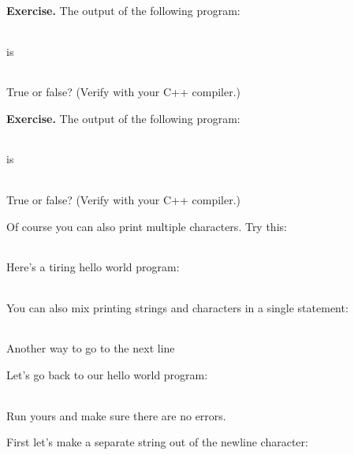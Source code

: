 \documentclass[
]{article}
\begin{document}
\textbf{Exercise.} The output of the following program:

\begin{longtable}[]{@{}@{}}
\toprule
\endhead
\bottomrule
\end{longtable}

is

\begin{longtable}[]{@{}@{}}
\toprule
\endhead
\bottomrule
\end{longtable}

True or false? (Verify with your C++ compiler.)

\textbf{Exercise.} The output of the following program:

\begin{longtable}[]{@{}@{}}
\toprule
\endhead
\bottomrule
\end{longtable}

is

\begin{longtable}[]{@{}@{}}
\toprule
\endhead
\bottomrule
\end{longtable}

True or false? (Verify with your C++ compiler.)

Of course you can also print multiple characters. Try this:

\begin{longtable}[]{@{}@{}}
\toprule
\endhead
\bottomrule
\end{longtable}

Here's a tiring hello world program:

\begin{longtable}[]{@{}@{}}
\toprule
\endhead
\bottomrule
\end{longtable}

You can also mix printing strings and characters in a single statement:

\begin{longtable}[]{@{}@{}}
\toprule
\endhead
\bottomrule
\end{longtable}

Another way to go to the next line

Let's go back to our hello world program:

\begin{longtable}[]{@{}@{}}
\toprule
\endhead
\bottomrule
\end{longtable}

Run yours and make sure there are no errors.

First let's make a separate string out of the newline character:
\end{document}
